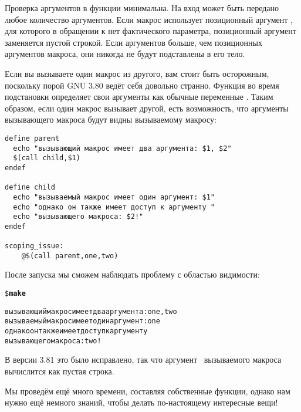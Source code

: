 Проверка аргументов в функции  минимальна.  На вход
может быть передано любое количество аргументов.  Если макрос
использует позиционный аргумент , для которого в
обращении к  нет фактического параметра, позиционный
аргумент заменяется пустой строкой.  Если аргументов 
больше, чем позиционных  аргументов макроса, они никогда не будут
подставлены в его тело.

Если вы вызываете один макрос из другого, вам стоит быть осторожным,
поскольку порой GNU \GNUmake{} 3.80 ведёт себя довольно странно.
Функция  во время подстановки определяет свои аргументы
как обычные переменные \GNUmake{}. Таким образом, если один макрос
вызывает другой, есть возможность, что аргументы вызывающего макроса
будут видны вызываемому макросу:

{\footnotesize
\begin{verbatim}
define parent
  echo "вызывающий макрос имеет два аргумента: $1, $2"
  $(call child,$1)
endef

define child
  echo "вызываемый макрос имеет один аргумент: $1"
  echo "однако он также имеет доступ к аргументу "
  echo "вызывающего макроса: $2!"
endef

scoping_issue:
    @$(call parent,one,two)
\end{verbatim}
}

После запуска \GNUmake{} мы сможем наблюдать проблему с областью
видимости:

{\footnotesize
\begin{alltt}
\$ \textbf{make}

вызывающий макрос имеет два аргумента: one, two
вызываемый макрос имеет один аргумент: one
однако он также имеет доступ к аргументу
вызывающего макроса: two!
\end{alltt}
}

В версии 3.81 это было исправлено, так что аргумент~
вызываемого макроса вычислится как пустая строка.

Мы проведём ещё много времени, составляя собственные функции, однако
нам нужно ещё немного знаний, чтобы делать по-настоящему интересные
вещи!
